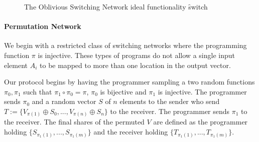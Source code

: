 \begin{figure}[ht]
	\caption{The Oblivious Switching Network ideal functionality \f{switch}}
	\label{fig:perm-ideal}	
\end{figure}


\paragraph{Permutation Network}

We begin with a restricted class of switching networks where the programming function $\pi$ is injective. These types of programs do not allow a single input element $A_i$ to be mapped to more than one location in the output vector. 

Our protocol begins by having the programmer sampling a two random functions $\pi_0,\pi_1$ such that $\pi_1 \circ \pi_0 = \pi$, $\pi_0$ is bijective and $\pi_1$ is injective. The programmer sends $\pi_0$ and a random vector $S$ of $n$ elements to the sender who send $T := \{V_{\pi(1)} \oplus S_0, ...,V_{\pi(n)} \oplus S_n \}$ to the receiver. The programmer sends $\pi_1$ to the receiver. The final shares of the permuted $V$ are defined as the programmer holding $\{S_{\pi_1(1)}, ..., S_{\pi_1(m)}\}$ and the receiver holding $\{T_{\pi_1(1)}, ..., T_{\pi_1(m)}\}$.

